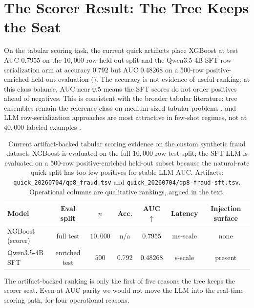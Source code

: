 \section{The Scorer Result: The Tree Keeps the Seat}
\label{sec:p8-scorer}

On the tabular scoring task, the current quick artifacts place XGBoost at test
AUC $0.7955$ on the $10{,}000$-row held-out split and the Qwen3.5-4B SFT
row-serialization arm at accuracy $0.792$ but AUC $0.48268$ on a 500-row
positive-enriched held-out evaluation (). The
accuracy is not evidence of useful ranking: at this class balance, AUC near
$0.5$ means the SFT scores do not order positives ahead of negatives. This is
consistent with the broader tabular literature: tree ensembles
remain the reference class on medium-sized tabular problems
\citep{grinsztajn2022tree, shwartzziv2021tabular}, and LLM row-serialization
approaches are most attractive in few-shot regimes, not at $40{,}000$ labeled
examples \citep{hegselmann2023tabllm}.

\begin{table}[t]
\centering
\caption{Current artifact-backed tabular scoring evidence on the custom
synthetic fraud dataset. XGBoost is evaluated on the full $10{,}000$-row test
split; the SFT LLM is evaluated on a 500-row positive-enriched held-out subset
because the natural-rate quick split has too few positives for stable LLM AUC.
Artifacts: \texttt{quick\_20260704/qp8\_fraud.tsv} and
\texttt{quick\_20260704/qp8-fraud-sft.tsv}. Operational columns are qualitative
rankings, argued in the text.}
\label{tab:p8-headtohead}
\small
\begin{tabular}{lcccccc}
\toprule
Model & Eval split & $n$ & Acc. & AUC $\uparrow$ & Latency & Injection surface \\
\midrule
XGBoost (scorer) & full test & $10{,}000$ & n/a & $\mathbf{0.7955}$ & ms-scale & none \\
Qwen3.5-4B SFT   & enriched test & $500$ & $0.792$ & $0.48268$ & s-scale & present \\
\bottomrule
\end{tabular}
\end{table}

The artifact-backed ranking is only the first of five reasons the tree keeps
the scorer seat. Even at AUC parity we would not move the LLM into the real-time scoring
path, for four operational reasons.

